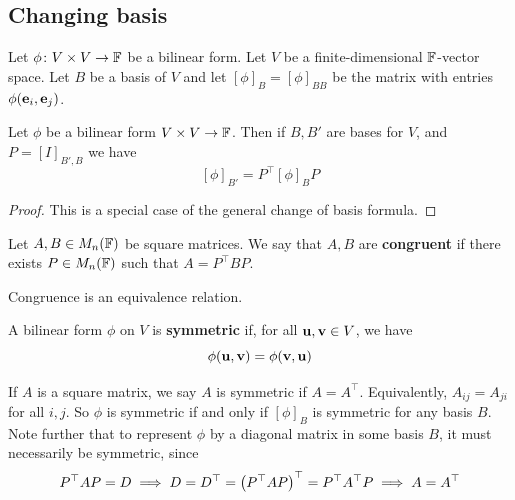 \documentclass[a4paper,11pt]{article}
\begin{document}
\subsection{Changing basis}
Let \( \phi \colon V \times V \to \mathbb {{\mathbb{F}}} \) be a bilinear form.
Let \( V \) be a finite-dimensional \( {\mathbb{F}} \)-vector space.
Let \( B \) be a basis of \( V \) and let \( [\phi]_B = [\phi]_{BB} \) be the matrix with entries \( \phi({\bf e}_i, {\bf e}_j) \).
\begin{lemma}
	Let \( \phi \) be a bilinear form \( V \times V \to {\mathbb{F}} \).
	Then if \( B, B' \) are bases for \( V \), and \( P = [I]_{B', B} \) we have
	\[
		[\phi]_{B'} = P^\top [\phi]_B P
	\]
\end{lemma}
\begin{proof}
	This is a special case of the general change of basis formula.
\end{proof}
\begin{definition}
	Let \( A, B \in M_n({\mathbb{F}}) \) be square matrices.
	We say that \( A, B \) are \textbf{congruent} if there exists \( P \in M_n({\mathbb{F}}) \) such that \( A = P^\top B P \).
\end{definition}
\begin{remark}
	Congruence is an equivalence relation.
\end{remark}
\begin{definition}
	A bilinear form \( \phi \) on \( V \) is \textbf{symmetric} if, for all \( {\bf u}, {\bf v} \in V \), we have
	\[
		\phi({\bf u},{\bf v}) = \phi({\bf v},{\bf u})
	\]
\end{definition}
\begin{remark}
	If \( A \) is a square matrix, we say \( A \) is symmetric if \( A = A^\top \).
	Equivalently, \( A_{ij} = A_{ji} \) for all \( i, j \).
	So \( \phi \) is symmetric if and only if \( [\phi]_B \) is symmetric for any basis \( B \).
	Note further that to represent \( \phi \) by a diagonal matrix in some basis \( B \), it must necessarily be symmetric, since
	\[
		P^\top A P = D \implies D = D^\top = \qty(P^\top A P)^\top = P^\top A^\top P \implies A = A^\top
	\]
\end{remark}
\end{document}

